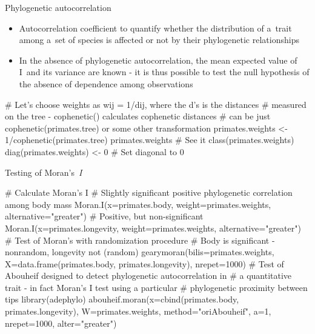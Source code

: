 \documentclass[compress, ucs, xelatex, 11pt, xcolor=svgnames,
  hyperref={
    bookmarks=true,
    unicode=true,
    colorlinks=true,
    pdftitle={Molecular data in R},
    plainpages=false,
    pdfauthor={Vojtech Zeisek},
    pdfsubject={Course about phylogeny and evolution in R},
    pdfcreator={XeLaTeX},
    pdfkeywords={R, evolution, phylogeny, molecular data},
    linkcolor=Tomato,
    anchorcolor=SaddleBrown,
    citecolor=Goldenrod,
    filecolor=DarkMagenta,
    menucolor=Sienna,
    urlcolor=DarkTurquoise,
    pdftex},
  url={hyphens, lowtilde} %
  ]{beamer}
\begin{document}
\begin{frame}[fragile]{Phylogenetic autocorrelation}
\begin{itemize}
 \item Autocorrelation coefficient to quantify whether the distribution of a~trait among a~set of species is affected or not by their phylogenetic relationships
 \item In the absence of phylogenetic autocorrelation, the mean expected value of I~and its variance are known - it is thus possible to test the null hypothesis of the absence of dependence among observations
\end{itemize}
  \begin{spluscode}
    # Let's choose weights as wij = 1/dij, where the d’s is the distances
    # measured on the tree - cophenetic() calculates cophenetic distances
    # can be just cophenetic(primates.tree) or some other transformation
    primates.weights <- 1/cophenetic(primates.tree)
    primates.weights # See it
    class(primates.weights)
    diag(primates.weights) <- 0 # Set diagonal to 0
\end{spluscode}
\end{frame}

\begin{frame}[fragile]{Testing of Moran's~\textit{I}}
  \begin{spluscode}
    # Calculate Moran's I
    # Slightly significant positive phylogenetic correlation among body mass
    Moran.I(x=primates.body, weight=primates.weights,
      alternative="greater")
    # Positive, but non-significant
    Moran.I(x=primates.longevity, weight=primates.weights,
      alternative="greater")
    # Test of Moran's with randomization procedure
    # Body is significant - nonrandom, longevity not (random)
    gearymoran(bilis=primates.weights, X=data.frame(primates.body,
      primates.longevity), nrepet=1000)
    # Test of Abouheif designed to detect phylogenetic autocorrelation in
    # a quantitative trait - in fact Moran's I test using a particular
    # phylogenetic proximity between tips
    library(adephylo)
    abouheif.moran(x=cbind(primates.body, primates.longevity),
      W=primates.weights, method="oriAbouheif", a=1, nrepet=1000,
      alter="greater")
  \end{spluscode}
\end{frame}
\end{document}
